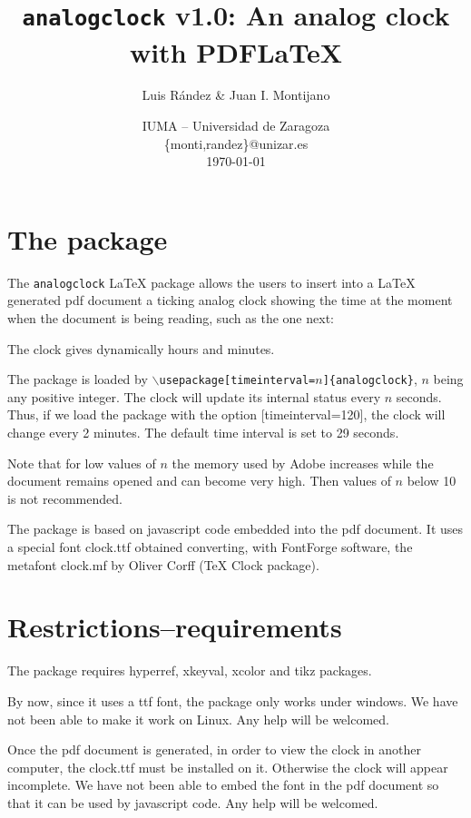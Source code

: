 \documentclass[12pt]{article}
\title{\texttt{analogclock} v1.0: An analog clock with PDF\LaTeX}
\author{Luis R\'{a}ndez \& Juan I. Montijano}
\date{IUMA -- Universidad de Zaragoza\\[6pt] \{monti,randez\}@unizar.es\\[6pt] \today}
\begin{document}
\maketitle


\initclock  %

\section{The package}
The \texttt{analogclock} \LaTeX\/ package
allows the users to insert into a \LaTeX\/ generated pdf document
a ticking analog clock showing the time at the moment when the document
is being reading, such as the one next:

\centerline{\Large\analogclock}

The clock gives dynamically hours and minutes.

The package is loaded by  \texttt{$\backslash$usepackage[timeinterval=$n$]\{analogclock\}},
$n$ being any positive integer. The clock will update its internal status every $n$ seconds.  Thus, if we load
the package with the option [timeinterval=120], the clock will change every 2 minutes.
The default time interval is set to 29 seconds.

Note that for low values of $n$ the memory used by Adobe increases while the document remains opened and can 
become very high.  Then values of $n$ below 10 is not recommended.

The package is based on javascript code embedded into the pdf document. It uses a special font clock.ttf  obtained
converting, with FontForge software, the metafont clock.mf by Oliver Corff (\TeX\/ Clock package).

\section{Restrictions--requirements}
The package  requires hyperref, xkeyval, xcolor and tikz packages.

By now, since it uses a ttf font, the package only works under windows.  We have not been able to make it
work on Linux.  Any help will be welcomed.

Once the pdf document is generated, in order to view the clock in another computer, the clock.ttf must be installed
on it.  Otherwise the clock will appear incomplete.  We have not been able to embed the font in the pdf document
so that it can be used by javascript code. Any help will be welcomed.
\end{document}
